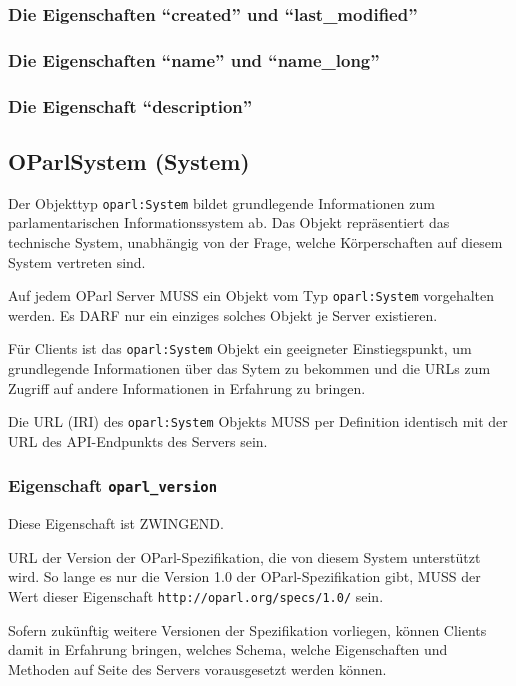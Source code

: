 \documentclass[,a4paper]{article}
\begin{document}
\subsubsection{Die Eigenschaften ``created'' und ``last\_modified''}

\subsubsection{Die Eigenschaften ``name'' und ``name\_long''}

\subsubsection{Die Eigenschaft ``description''}

\subsection{OParlSystem (System)}

Der Objekttyp \texttt{oparl:System} bildet grundlegende Informationen
zum parlamentarischen Informationssystem ab. Das Objekt repräsentiert
das technische System, unabhängig von der Frage, welche Körperschaften
auf diesem System vertreten sind.

Auf jedem OParl Server MUSS ein Objekt vom Typ \texttt{oparl:System}
vorgehalten werden. Es DARF nur ein einziges solches Objekt je Server
existieren.

Für Clients ist das \texttt{oparl:System} Objekt ein geeigneter
Einstiegspunkt, um grundlegende Informationen über das Sytem zu bekommen
und die URLs zum Zugriff auf andere Informationen in Erfahrung zu
bringen.

Die URL (IRI) des \texttt{oparl:System} Objekts MUSS per Definition
identisch mit der URL des API-Endpunkts des Servers sein.

\subsubsection{Eigenschaft \texttt{oparl\_version}}

Diese Eigenschaft ist ZWINGEND.

URL der Version der OParl-Spezifikation, die von diesem System
unterstützt wird. So lange es nur die Version 1.0 der
OParl-Spezifikation gibt, MUSS der Wert dieser Eigenschaft
\texttt{http://oparl.org/specs/1.0/} sein.

Sofern zukünftig weitere Versionen der Spezifikation vorliegen, können
Clients damit in Erfahrung bringen, welches Schema, welche Eigenschaften
und Methoden auf Seite des Servers vorausgesetzt werden können.
\end{document}
